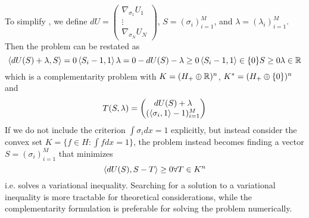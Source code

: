 To simplify , we define $dU = \begin{pmatrix} \nabla_{\sigma_1} U_1 \\
    \vdots \\
    \nabla_{\sigma_N} U_N \end{pmatrix}$, $S=(\sigma_i)_{i=1}^M$, and $\lambda = (\lambda_i)_{i=1}^M$. Then the problem can be restated as
\begin{equation}
  \label{eq:complementarity_form}
  \left \langle dU(S)+\lambda,S \right \rangle = 0 \\
  \left \langle S_i-1,1 \right \rangle\lambda = 0
  -dU(S)-\lambda \geq 0 \\
  \left \langle S_i-1,1 \right \rangle \in \{0 \}
  S\geq 0
  \lambda \in \mathbb{R}
\end{equation}
which is a complementarity problem with $K = (H_+ \oplus \mathbb{R})^n$, $K^* = (H_+ \oplus \{0\})^n$ and
\begin{equation}
  T(S,\lambda)=\begin{pmatrix} dU(S) + \lambda \\ (\left \langle \sigma_i,1 \right \rangle - 1)_{i=1}^M \end{pmatrix}
\end{equation}
If we do not include the criterion $\int \sigma_i dx = 1$ explicitly, but instead consider the convex set $K=\{f \in H: \int f dx = 1\}$, the problem instead becomes finding a vector $S = (\sigma_i)_{i=1}^M$ that minimizes
\begin{equation}
  \left \langle dU(S),S-T \right \rangle \geq 0 \forall T\in K^n
\end{equation}
i.e. solves a variational inequality. Searching for a solution to a variational inequality is more tractable for theoretical considerations, while the complementarity formulation is preferable for solving the problem numerically.

